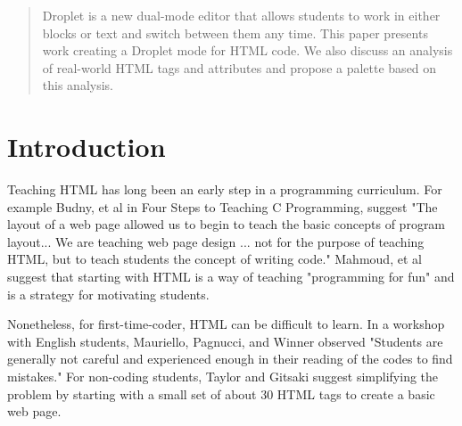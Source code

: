 \documentclass[conference]{IEEEtran}
\begin{document}
\begin{abstract}
  Droplet is a new dual-mode editor that allows students to work in either blocks or text and switch between them any time. This paper presents work creating a Droplet mode for HTML code. We also discuss an analysis of real-world HTML tags and attributes and propose a palette based on this analysis.

\end{abstract}





%
\IEEEpeerreviewmaketitle

\section{Introduction}
Teaching HTML has long been an early step in a programming curriculum.  For example Budny, et al \cite{Budny} in Four Steps to Teaching C Programming, suggest "The layout of a web page allowed us to begin to teach the basic concepts of program layout... We are teaching web page design ... not for the purpose of teaching HTML, but to teach students the concept of writing code." Mahmoud, et al \cite{Mahmoud} suggest that starting with HTML is a way of teaching "programming for fun" and is a strategy for motivating students.

Nonetheless, for first-time-coder, HTML can be difficult to learn.  In a workshop with English students, Mauriello, Pagnucci, and Winner \cite{Mauriello} observed "Students are generally not careful and experienced enough in their reading of the codes to find mistakes."  For non-coding students, Taylor and Gitsaki \cite{Taylor} suggest simplifying the problem by starting with a small set of about 30 HTML tags to create a basic web page.
\end{document}
